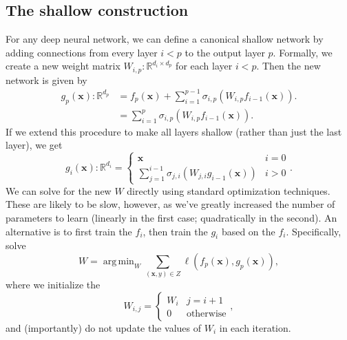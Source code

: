 \documentclass{article}
\DeclareMathOperator*{\argmin}{arg\,min}
\newcommand{\R}{\mathbb{R}}
\newcommand{\Z}{Z}
\newcommand{\w}{W}
\newcommand{\x}{\mathbf{x}}
\newcommand{\loss}{\ell}
\begin{document}
\subsection{The shallow construction}

For any deep neural network, we can define a canonical shallow network by adding connections from every layer $i<p$ to the output layer $p$.
Formally, we create a new weight matrix $\w_{i,p} : \R^{d_i\times d_p}$ for each layer $i<p$.
Then the new network is given by
\begin{align}
    g_p(\x) : \R^{d_p} &= 
    f_p(\x)
    +
    \sum_{i=1}^{p-1}
    \sigma_{i,p}(\w_{i,p} f_{i-1}(\x))
    .
    \\&=
    \sum_{i=1}^{p}
    \sigma_{i,p}(\w_{i,p} f_{i-1}(\x))
    .
\end{align}
If we extend this procedure to make all layers shallow (rather than just the last layer), we get
\begin{equation}
    g_i(\x) : \R^{d_i} = 
    \begin{cases}
        \x & i=0 \\
        \displaystyle
        \sum_{j=1}^{i-1}\sigma_{j,i}(\w_{j,i} g_{i-1}(\x)) & i>0 
    \end{cases}
    .
\end{equation}
We can solve for the new $\w$ directly using standard optimization techniques.
These are likely to be slow, however, as we've greatly increased the number of parameters to learn
(linearly in the first case; quadratically in the second).
An alternative is to first train the $f_i$, then train the $g_i$ based on the $f_i$.
Specifically, solve
\begin{equation}
    \w = \argmin_\w \sum_{(\x,y)\in\Z} \loss(f_p(\x),g_p(\x)),
\end{equation}
where we initialize the 
\begin{equation}
    \w_{i,j} =
    \begin{cases}
        \w_i & j=i+1 \\
        0 & \text{otherwise}
    \end{cases}
    ,
\end{equation}
and (importantly) do not update the values of $\w_i$ in each iteration.   


\clearpage



\end{document}
